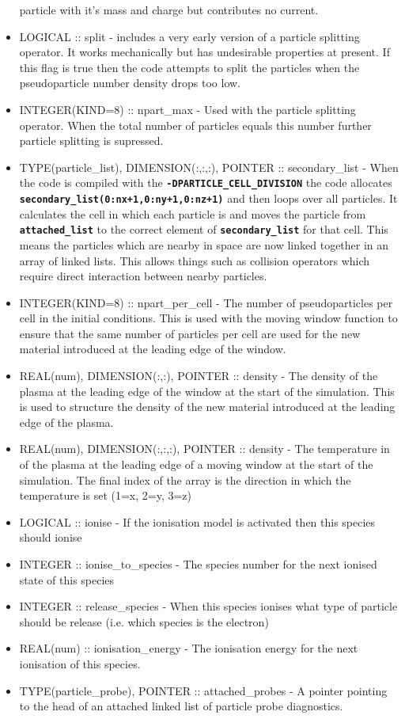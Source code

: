 \documentclass[12pt,a4paper]{article}
\newcommand{\inlinecode}[1]{{\color{warwickred} \bf\texttt{#1}}}
\newcommand{\EPOCH}{{\color{warwickdark}\fontfamily{phv}\selectfont{EPOCH}}}
\begin{document}
\begin{itemize}
  particle with it's mass and charge but contributes no current.
\item LOGICAL :: split - {\EPOCH} includes a very early version of a particle
  splitting operator. It works mechanically but has undesirable properties at
  present. If this flag is true then the code attempts to split the particles
  when the pseudoparticle number density drops too low.
\item INTEGER(KIND=8) :: npart\_max - Used with the particle splitting
  operator. When the total number of particles equals this number further
  particle splitting is supressed.
\item TYPE(particle\_list), DIMENSION(:,:,:), POINTER :: secondary\_list - When the
  code is compiled with the \inlinecode{-DPARTICLE\_CELL\_DIVISION} the code
  allocates \inlinecode{secondary\_list(0:nx+1,0:ny+1,0:nz+1)} and then loops
  over all particles. It calculates the cell in which each particle is and
  moves the particle from \inlinecode{attached\_list} to the correct element of
  \inlinecode{secondary\_list} for that cell. This means the particles which are
  nearby in space are now linked together in an array of linked lists. This
  allows things such as collision operators which require direct interaction
  between nearby particles.
\item INTEGER(KIND=8) :: npart\_per\_cell - The number of pseudoparticles per
  cell in the initial conditions. This is used with the moving window function
  to ensure that the same number of particles per cell are used for the new
  material introduced at the leading edge of the window.
\item REAL(num), DIMENSION(:,:), POINTER :: density - The density of the plasma
  at the leading edge of the window at the start of the simulation. This is
  used to structure the density of the new material introduced at the leading
  edge of the plasma.
\item REAL(num), DIMENSION(:,:,:), POINTER :: density - The temperature in of
  the plasma at the leading edge of a moving window at the start of the
  simulation. The final index of the array is the direction in which the
  temperature is set (1=x, 2=y, 3=z)
\item LOGICAL :: ionise - If the ionisation model is activated then this
  species should ionise
\item INTEGER :: ionise\_to\_species - The species number for the next ionised
  state of this species
\item INTEGER :: release\_species - When this species ionises what type of
  particle should be release (i.e. which species is the electron)
\item REAL(num) :: ionisation\_energy - The ionisation energy for the next
  ionisation of this species.
\item TYPE(particle\_probe), POINTER :: attached\_probes - A pointer pointing to
  the head of an attached linked list of particle probe diagnostics.
\end{itemize}
\end{document}
